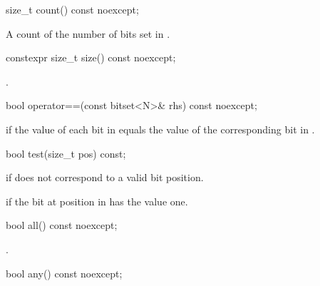 %
\begin{itemdecl}
size_t count() const noexcept;
\end{itemdecl}

\begin{itemdescr}
\pnum
\returns
A count of the number of bits set in
.
\end{itemdescr}

%
\begin{itemdecl}
constexpr size_t size() const noexcept;
\end{itemdecl}

\begin{itemdescr}
\pnum
\returns
{}.
\end{itemdescr}

%
\begin{itemdecl}
bool operator==(const bitset<N>& rhs) const noexcept;
\end{itemdecl}

\begin{itemdescr}
\pnum
\returns
{} if the value of each bit in
equals the value of the corresponding bit in .
\end{itemdescr}

%
\begin{itemdecl}
bool test(size_t pos) const;
\end{itemdecl}

\begin{itemdescr}
\pnum
\throws
{}
if  does not correspond to a valid bit position.%

\pnum
\returns
{}
if the bit at position 
in
has the value one.
\end{itemdescr}

%
\begin{itemdecl}
bool all() const noexcept;
\end{itemdecl}

\begin{itemdescr}
\pnum
\returns
{}.
\end{itemdescr}

%
%
\begin{itemdecl}
bool any() const noexcept;
\end{itemdecl}

